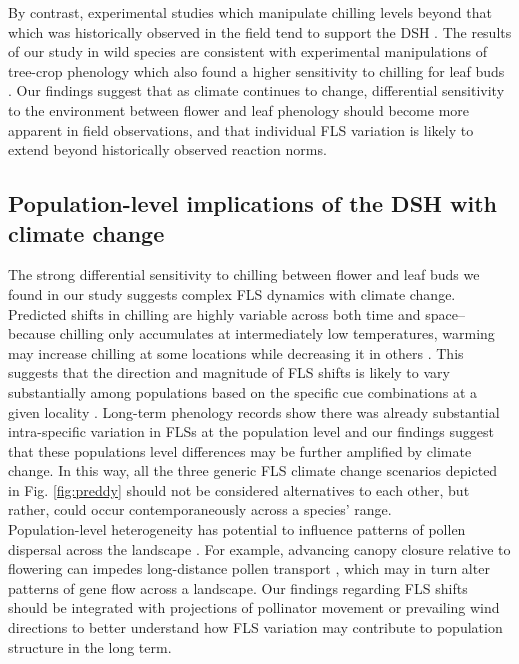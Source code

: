 \documentclass[11pt]{article}\usepackage[]{graphicx}\usepackage[]{color}
\begin{document}
\noindent By contrast, experimental studies which manipulate chilling levels beyond that which was historically observed in the field tend to support the DSH \citep[e.g.][]{Aslani2009,Gariglio2006}. The results of our study in wild species are consistent with experimental manipulations of tree-crop phenology which also found a higher sensitivity to chilling for leaf buds \citep{Gariglio2006,Citadin2001}. Our findings suggest that as climate continues to change, differential sensitivity to the environment between flower and leaf phenology should become more apparent in field observations, and that individual FLS variation is likely to extend beyond historically observed reaction norms.\\

\subsection*{Population-level implications of the DSH with climate change}
\noindent The strong differential sensitivity to chilling between flower and leaf buds we found in our study suggests complex FLS dynamics with climate change. Predicted shifts in chilling are highly variable across both time and space-- because chilling only accumulates at intermediately low temperatures, warming may increase chilling at some locations while decreasing it in others \citep{Man2017,Zhang:2007aa}. This suggests that the direction and magnitude of FLS shifts is likely to vary substantially among populations based on the specific cue combinations at a given locality \citep{Chmielewski:2012aa}. Long-term phenology records show there was already substantial intra-specific variation in FLSs at the population level \citep{Buonaiuto2020} and our findings suggest that these populations level differences may be further amplified by climate change. In this way, all the three generic FLS climate change scenarios depicted in Fig. \ref{fig:preddy} should not be considered alternatives to each other, but rather, could occur contemporaneously across a species' range. \\ 

\noindent Population-level heterogeneity has potential to influence patterns of pollen dispersal across the landscape \citep{Borycka2017,Pace:2018aa}. For example, advancing canopy closure relative to flowering can impedes long-distance pollen transport \citep{Milleron2012}, which may in turn alter patterns of gene flow across a landscape. Our findings regarding FLS shifts should be integrated with projections of pollinator movement or prevailing wind directions \citep{Kling:2020aa} to better understand how FLS variation may contribute to population structure in the long term. \\
\end{document}
